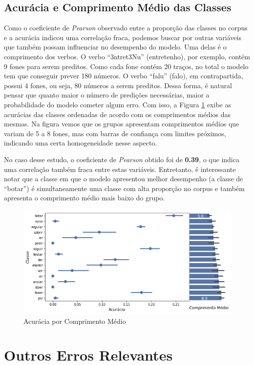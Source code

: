 \subsection{Acurácia e Comprimento Médio das Classes}

Como o coeficiente de \textit{Pearson} observado entre a proporção das classes no corpus e a acurácia indicou uma correlação fraca, podemos buscar por outras variáveis que também possam influenciar no desempenho do modelo. Uma delas é o comprimento dos verbos. O verbo “3ntret3Nu” (entretenho), por exemplo, contém 9 fones para serem preditos. Como cada fone contém 20 traços, no total o modelo tem que conseguir prever 180 números. O verbo “falu” (falo), em contrapartida, possui 4 fones, ou seja, 80 números a serem preditos. Dessa forma, é natural pensar que quanto maior o número de predições necessárias, maior a probabilidade do modelo cometer algum erro. Com isso, a Figura \ref{fig:kfoldprop} exibe as acurácias das classes ordenadas de acordo com os comprimentos médios das mesmas. Na figura vemos que os grupos apresentam comprimentos médios que variam de 5 a 8 fones, mas com barras de confiança com limites próximos, indicando uma certa homogeneidade nesse aspecto.

No caso desse estudo, o coeficiente de \textit{Pearson} obtido foi de \textbf{0.39}, o que indica uma correlação também fraca entre estas variáveis. Entretanto, é interessante notar que a classe em que o modelo apresentou melhor desempenho (a classe de “botar”) é simultaneamente uma classe com alta proporção no corpus e também apresenta o comprimento médio mais baixo do grupo.

\begin{figure}[H]
  \centering
  \includegraphics[width=0.8\linewidth]{img/comp_acc.png}
  \caption{Acurácia por Comprimento Médio}
  \label{fig:kfoldprop}
\end{figure}


\section{Outros Erros Relevantes}
\label{sec:interesting}

